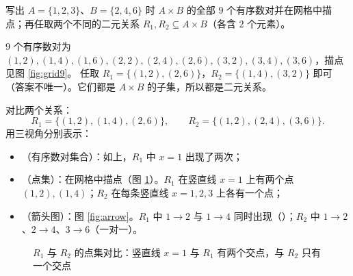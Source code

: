 \begin{explore}
\begin{example}
写出 $A=\{1,2,3\}$、$B=\{2,4,6\}$ 时 $A\times B$ 的全部 $9$ 个有序数对并在网格中描点；再任取两个不同的二元关系 $R_1,R_2\subseteq A\times B$（各含 $2$ 个元素）。
\end{example}
\begin{solution}
$9$ 个有序数对为 $(1,2),(1,4),(1,6),(2,2),(2,4),(2,6),(3,2),(3,4),(3,6)$，描点见图 \ref{fig:grid9}。
任取 $R_1=\{(1,2),(2,6)\}$，$R_2=\{(1,4),(3,2)\}$ 即可（答案不唯一）。它们都是 $A\times B$ 的子集，所以都是二元关系。
\end{solution}

对比两个关系：
\[
  R_1=\{(1,2),(1,4),(2,6)\},\qquad R_2=\{(1,2),(2,4),(3,6)\}.
\]
用三视角分别表示：
\begin{itemize}
  \item {}（有序数对集合）：如上，$R_1$ 中 $x=1$ 出现了两次；
  \item {}（点集）：在网格中描点（图 \ref{fig:r1r2}）。$R_1$ 在竖直线 $x=1$ 上有两个点 $(1,2),(1,4)$；$R_2$ 在每条竖直线 $x=1,2,3$ 上各有一个点；
  \item {}（箭头图）：图 \ref{fig:arrow}。$R_1$ 中 $1\to2$ 与 $1\to4$ 同时出现（）；$R_2$ 中 $1\to2$、$2\to4$、$3\to6$（一对一）。
\end{itemize}

\begin{figure}[htbp]
  \centering
  \begin{minipage}{0.48\textwidth}
    \centering
  \end{minipage}\hfill
  \begin{minipage}{0.48\textwidth}
    \centering
  \end{minipage}
  \caption{$R_1$ 与 $R_2$ 的点集对比：竖直线 $x=1$ 与 $R_1$ 有两个交点，与 $R_2$ 只有一个交点}
  \label{fig:r1r2}
\end{figure}


\end{explore}
